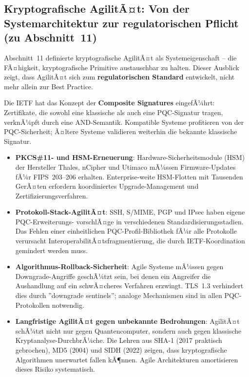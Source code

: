 ﻿\documentclass[a4paper,12pt]{article}
\theoremstyle{definition}
\begin{document}
\subsection{Kryptografische AgilitÃ¤t: Von der Systemarchitektur zur regulatorischen Pflicht (zu Abschnitt~11)}

Abschnitt~11 definierte kryptografische AgilitÃ¤t als
Systemeigenschaft -- die FÃ¤higkeit, kryptografische Primitive
austauschbar zu halten. Dieser Ausblick zeigt, dass AgilitÃ¤t
sich zum \textbf{regulatorischen Standard} entwickelt, nicht
mehr allein zur Best Practice.

Die IETF hat das Konzept der \textbf{Composite Signatures}
eingefÃ¼hrt: Zertifikate, die sowohl eine klassische als auch
eine PQC-Signatur tragen, verknÃ¼pft durch eine AND-Semantik.
Kompatible Systeme profitieren von der PQC-Sicherheit;
Ã¤ltere Systeme validieren weiterhin die bekannte klassische Signatur.

\begin{itemize}
  \item \textbf{PKCS\#11- und HSM-Erneuerung}:
    Hardware-Sicherheitsmodule (HSM) der Hersteller Thales, nCipher
    und Utimaco mÃ¼ssen Firmware-Updates fÃ¼r FIPS~203--206 erhalten.
    Enterprise-weite HSM-Flotten mit Tausenden GerÃ¤ten erfordern
    koordiniertes Upgrade-Management und Zertifizierungsverfahren.
  \item \textbf{Protokoll-Stack-AgilitÃ¤t}:
    SSH, S/MIME, PGP und IPsec haben eigene PQC-Erweiterungs-
    vorschlÃ¤ge in verschiedenen Standardisierungsstadien.
    Das Fehlen einer einheitlichen PQC-Profil-Bibliothek fÃ¼r
    alle Protokolle verursacht InteroperabilitÃ¤tsfragmentierung,
    die durch IETF-Koordination gemindert werden muss.
  \item \textbf{Algorithmus-Rollback-Sicherheit}:
    Agile Systeme mÃ¼ssen gegen Downgrade-Angriffe geschÃ¼tzt sein,
    bei denen ein Angreifer die Aushandlung auf ein schwÃ¤cheres
    Verfahren erzwingt. TLS~1.3 verhindert dies durch
    ''downgrade sentinels''; analoge Mechanismen sind in allen
    PQC-Protokollen notwendig.
  \item \textbf{Langfristige AgilitÃ¤t gegen unbekannte Bedrohungen}:
    AgilitÃ¤t schÃ¼tzt nicht nur gegen Quantencomputer, sondern auch
    gegen klassische Kryptanalyse-Durch\-brÃ¼che. Die Lehren aus
    SHA-1 (2017 praktisch gebrochen), MD5 (2004) und SIDH (2022)
    zeigen, dass kryptografische Algorithmen unerwartet fallen kÃ¶nnen.
    Agile Architekturen amortisieren dieses Risiko systematisch.
\end{itemize}
\end{document}
